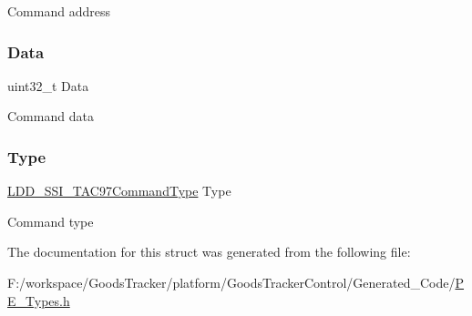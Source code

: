 Command address \mbox{\label{struct_l_d_d___s_s_i___t_a_c97_command_a6f3335509cc4943e20df66f72483910c}} 
\subsubsection{\texorpdfstring{Data}{Data}}
{\footnotesize\ttfamily uint32\+\_\+t Data}

Command data \mbox{\label{struct_l_d_d___s_s_i___t_a_c97_command_aa982cc924bb2becfceec68de33b9aeb5}} 
\subsubsection{\texorpdfstring{Type}{Type}}
{\footnotesize\ttfamily \hyperlink{group___p_e___types__module_gac7398329f7fdf5c8834b026e63f5edc2}{L\+D\+D\+\_\+\+S\+S\+I\+\_\+\+T\+A\+C97\+Command\+Type} Type}

Command type 

The documentation for this struct was generated from the following file\+:\begin{DoxyCompactItemize}
\item 
F\+:/workspace/\+Goods\+Tracker/platform/\+Goods\+Tracker\+Control/\+Generated\+\_\+\+Code/\hyperlink{_p_e___types_8h}{P\+E\+\_\+\+Types.\+h}\end{DoxyCompactItemize}

